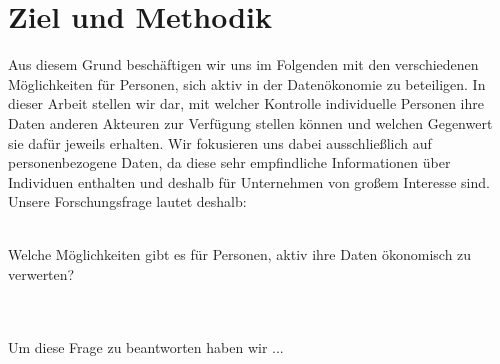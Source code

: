 \section{Ziel und Methodik}

Aus diesem Grund beschäftigen wir uns im Folgenden mit den verschiedenen Möglichkeiten für Personen, sich aktiv in der Datenökonomie zu beteiligen. In dieser Arbeit stellen wir dar, mit welcher Kontrolle individuelle Personen ihre Daten anderen Akteuren zur Verfügung stellen können und welchen Gegenwert sie dafür jeweils erhalten. Wir fokusieren uns dabei ausschließlich auf personenbezogene Daten, da diese sehr empfindliche Informationen über Individuen enthalten und deshalb für Unternehmen von großem Interesse sind. Unsere Forschungsfrage lautet deshalb:
\\
\\
\centerline{Welche Möglichkeiten gibt es für Personen, aktiv ihre Daten ökonomisch zu verwerten?}
\\
\\
Um diese Frage zu beantworten haben wir ...